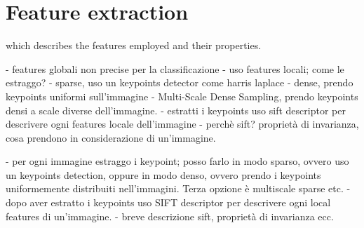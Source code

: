 \section{Feature extraction}

which describes the features employed and their properties.

- features globali non precise per la classificazione
- uso features locali; come le estraggo?
- sparse, uso un keypoints detector come harris laplace
- dense, prendo keypoints uniformi sull'immagine
- Multi-Scale Dense Sampling, prendo keypoints densi a scale diverse dell'immagine.
- estratti i keypoints uso sift descriptor per descrivere ogni features locale dell'immagine
- perchè sift? proprietà di invarianza, cosa prendono in considerazione di un'immagine.

- per ogni immagine estraggo i keypoint; posso farlo in modo sparso, ovvero uso un keypoints detection, oppure in modo denso, ovvero prendo i keypoints uniformemente distribuiti nell'immagini. Terza opzione è multiscale sparse etc.
- dopo aver estratto i keypoints uso SIFT descriptor per descrivere ogni local features di un'immagine.
- breve descrizione sift, proprietà di invarianza ecc.